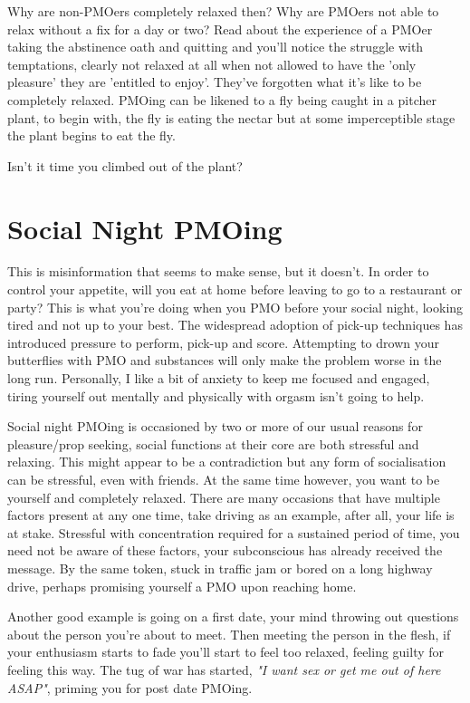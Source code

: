 \documentclass[easypeasy.tex]{subfiles}
\begin{document}
Why are non-PMOers completely relaxed then? Why are PMOers not able to relax without a fix for a day or two? Read about the experience of a PMOer taking the abstinence oath and quitting and you'll notice the struggle with temptations, clearly not relaxed at all when not allowed to have the 'only pleasure' they are 'entitled to enjoy'. They've forgotten what it's like to be completely relaxed. PMOing can be likened to a fly being caught in a pitcher plant, to begin with, the fly is eating the nectar but at some imperceptible stage the plant begins to eat the fly.

Isn't it time you climbed out of the plant?

\section{Social Night PMOing}

This is misinformation that seems to make sense, but it doesn't. In order to control your appetite, will you eat at home before leaving to go to a restaurant or party? This is what you're doing when you PMO before your social night, looking tired and not up to your best. The widespread adoption of pick-up techniques has introduced pressure to perform, pick-up and score. Attempting to drown your butterflies with PMO and substances will only make the problem worse in the long run. Personally, I like a bit of anxiety to keep me focused and engaged, tiring yourself out mentally and physically with orgasm isn't going to help.

Social night PMOing is occasioned by two or more of our usual reasons for pleasure/prop seeking, social functions at their core are both stressful and relaxing. This might appear to be a contradiction but any form of socialisation can be stressful, even with friends. At the same time however, you want to be yourself and completely relaxed. There are many occasions that have multiple factors present at any one time, take driving as an example, after all, your life is at stake. Stressful with concentration required for a sustained period of time, you need not be aware of these factors, your subconscious has already received the message. By the same token, stuck in traffic jam or bored on a long highway drive, perhaps promising yourself a PMO upon reaching home.

Another good example is going on a first date, your mind throwing out questions about the person you're about to meet. Then meeting the person in the flesh, if your enthusiasm starts to fade you'll start to feel too relaxed, feeling guilty for feeling this way. The tug of war has started, \textit{"I want sex or get me out of here ASAP"}, priming you for post date PMOing.
\end{document}
